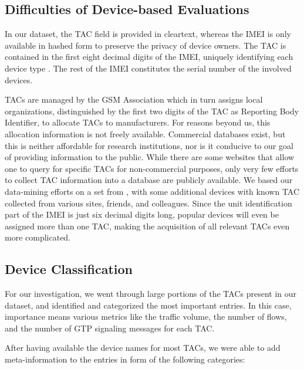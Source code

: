 \subsection{Difficulties of Device-based Evaluations}

In our dataset, the \ac{TAC} field is provided in clear\-text, whereas the \ac{IMEI} is only available in hashed form to preserve the privacy of device owners. The \ac{TAC} is contained in the first eight decimal digits of the \ac{IMEI}, uniquely identifying each device type \cite{3gpp23003}. The rest of the \ac{IMEI} constitutes the serial number of the involved devices.

\acp{TAC} are managed by the GSM Association which in turn assigns local organizations, distinguished by the first two digits of the \ac{TAC} as Reporting Body Identifier, to allocate \acp{TAC} to manufacturers. For reasons beyond us, this allocation information is not freely available. Commercial databases exist, but this is neither affordable for research institutions, nor is it conducive to our goal of providing information to the public. While there are some websites that allow one to query for specific \acp{TAC} for non-commercial purposes, only very few efforts to collect \ac{TAC} information into a database are publicly available. We based our data-mining efforts on a set from \cite{tacdb}, with some additional devices with known \ac{TAC} collected from various sites, friends, and colleagues. Since the unit identification part of the \ac{IMEI} is just six decimal digits long, popular devices will even be assigned more than one TAC, making the acquisition of all relevant \acp{TAC} even more complicated.



\subsection{Device Classification}

For our investigation, we went through large portions of the \acp{TAC} present in our dataset, and identified and categorized the most important entries. In this case, importance means various metrics like the traffic volume, the number of flows, and the number of \ac{GTP} signaling messages for each \ac{TAC}. 

After having available the device names for most \acp{TAC}, we were able to add meta-information to the entries in form of the following categories:

